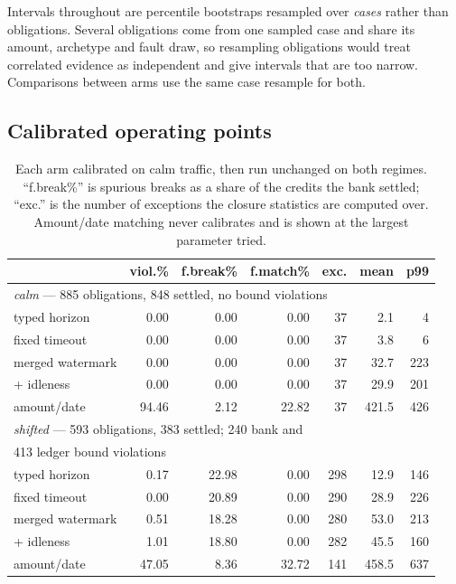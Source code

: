 \documentclass[10pt,conference]{IEEEtran}
\begin{document}
Intervals throughout are percentile bootstraps resampled over \emph{cases}
rather than obligations. Several obligations come from one sampled case and
share its amount, archetype and fault draw, so resampling obligations would
treat correlated evidence as independent and give intervals that are too
narrow. Comparisons between arms use the same case resample for both.

\subsection{Calibrated operating points}

\begin{table}[t]
\caption{Each arm calibrated on calm traffic, then run unchanged on both
regimes. ``f.break\%'' is spurious breaks as a share of the credits the bank
settled; ``exc.'' is the number of exceptions the closure statistics are
computed over. Amount/date matching never calibrates and is shown at the
largest parameter tried.}
\label{tab:main}
\centering
\footnotesize
\begin{tabular}{lrrrrrr}
\toprule
& viol.\% & f.break\% & f.match\% & exc. & mean & p99 \\
\midrule
\multicolumn{7}{l}{\emph{calm} --- 885 obligations, 848 settled, no bound violations} \\
typed horizon      & 0.00 & 0.00 & 0.00 & 37 & 2.1 & 4 \\
fixed timeout      & 0.00 & 0.00 & 0.00 & 37 & 3.8 & 6 \\
merged watermark   & 0.00 & 0.00 & 0.00 & 37 & 32.7 & 223 \\
\quad + idleness   & 0.00 & 0.00 & 0.00 & 37 & 29.9 & 201 \\
amount/date        & 94.46 & 2.12 & 22.82 & 37 & 421.5 & 426 \\
\midrule
\multicolumn{7}{l}{\emph{shifted} --- 593 obligations, 383 settled; 240 bank and} \\
\multicolumn{7}{l}{413 ledger bound violations} \\
typed horizon      & 0.17 & 22.98 & 0.00 & 298 & 12.9 & 146 \\
fixed timeout      & 0.00 & 20.89 & 0.00 & 290 & 28.9 & 226 \\
merged watermark   & 0.51 & 18.28 & 0.00 & 280 & 53.0 & 213 \\
\quad + idleness   & 1.01 & 18.80 & 0.00 & 282 & 45.5 & 160 \\
amount/date        & 47.05 & 8.36 & 32.72 & 141 & 458.5 & 637 \\
\bottomrule
\end{tabular}
\end{table}
\end{document}
